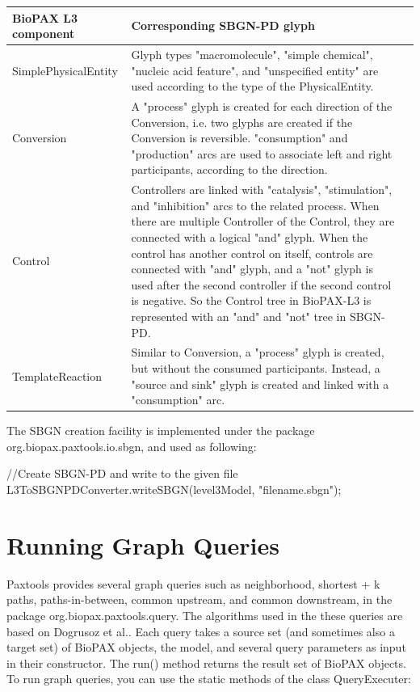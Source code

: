 \documentclass{tufte-book}
\begin{document}
\bigskip
\begin{center}
\footnotesize
\begin{tabular}{lp{10cm}l}
\toprule
BioPAX L3 component & Corresponding SBGN-PD glyph \\
\midrule
SimplePhysicalEntity &Glyph types "macromolecule", "simple chemical", "nucleic acid feature", and "unspecified entity" 
are used according to the type of the PhysicalEntity. \\
Conversion & A "process" glyph is created for each direction of the Conversion, i.e. two glyphs are created if the Conversion is reversible. "consumption" and "production" arcs are used to associate left and right participants, according to the direction.\\
Control & Controllers are linked with "catalysis", "stimulation", and "inhibition" arcs to the related process. When there are multiple Controller of the Control, they are connected with a logical "and" glyph. When the control has another control on itself, controls are connected with "and" glyph, and a "not" glyph is used after the second controller if the second control is negative. So the Control tree in BioPAX-L3 is represented with an "and" and "not" tree in SBGN-PD.\\
TemplateReaction & Similar to Conversion, a "process" glyph is created, but without the consumed participants. Instead, a "source and sink" glyph is created and linked with a "consumption" arc. \\
\bottomrule
\end{tabular}
\end{center}

The SBGN creation facility is implemented under the package org.biopax.paxtools.io.sbgn, and used as following:

\begin{javacode}
  //Create SBGN-PD and write to the given file
  L3ToSBGNPDConverter.writeSBGN(level3Model, "filename.sbgn");
\end{javacode}

\chapter{Running Graph Queries}

Paxtools provides several graph queries such as neighborhood, shortest + k paths, paths-in-between, common upstream, and common downstream, in the package org.biopax.paxtools.query. The algorithms used in the these queries are based on Dogrusoz et al.\cite{Dogrusoz2009}. Each query takes a source set (and sometimes also a target set) of BioPAX objects, the model, and several query parameters as input in their constructor. The run() method returns the result set of BioPAX objects.
To run graph queries, you can use the static methods of the class QueryExecuter:
\end{document}
